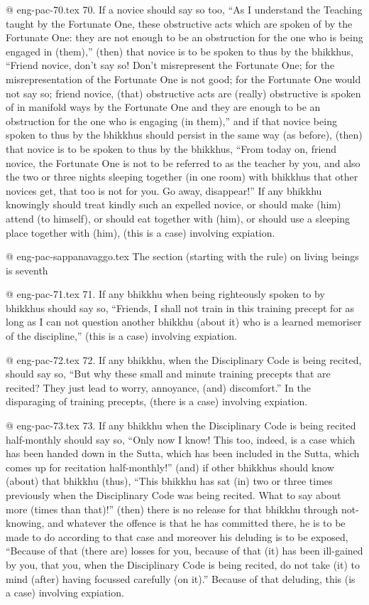 @ eng-pac-70.tex
70. If a novice should say so too, “As I understand the Teaching taught by the Fortunate One, these obstructive acts which are spoken of by the Fortunate One: they are not enough to be an obstruction for the one who is being engaged in (them),” (then) that novice is to be spoken to thus by the bhikkhus, “Friend novice, don't say so! Don't misrepresent the Fortunate One; for the misrepresentation of the Fortunate One is not good; for the Fortunate One would not say so; friend novice, (that) obstructive acts are (really) obstructive is spoken of in manifold ways by the Fortunate One and they are enough to be an obstruction for the one who is engaging (in them),” and if that novice being spoken to thus by the bhikkhus should persist in the same way (as before), (then) that novice is to be spoken to thus by the bhikkhus, “From today on, friend novice, the Fortunate One is not to be referred to as the teacher by you, and also the two or three nights sleeping together (in one room) with bhikkhus that other novices get, that too is not for you. Go away, disappear!” If any bhikkhu knowingly should treat kindly such an expelled novice, or should make (him) attend (to himself), or should eat together with (him), or should use a sleeping place together with (him), (this is a case) involving expiation.

@ eng-pac-sappanavaggo.tex
The section (starting with the rule) on living beings is seventh

@ eng-pac-71.tex
71. If any bhikkhu when being righteously spoken to by bhikkhus should say so, “Friends, I shall not train in this training precept for as long as I can not question another bhikkhu (about it) who is a learned memoriser of the discipline,” (this is a case) involving expiation.

@ eng-pac-72.tex
72. If any bhikkhu, when the Disciplinary Code is being recited, should say so, “But why these small and minute training precepts that are recited? They just lead to worry, annoyance, (and) discomfort.” In the disparaging of training precepts, (there is a case) involving expiation.

@ eng-pac-73.tex
73. If any bhikkhu when the Disciplinary Code is being recited half-monthly should say so, “Only now I know! This too, indeed, is a case which has been handed down in the Sutta, which has been included in the Sutta, which comes up for recitation half-monthly!” (and) if other bhikkhus should know (about) that bhikkhu (thus), “This bhikkhu has sat (in) two or three times previously when the Disciplinary Code was being recited. What to say about more (times than that)!” (then) there is no release for that bhikkhu through not-knowing, and whatever the offence is that he has committed there, he is to be made to do according to that case and moreover his deluding is to be exposed, “Because of that (there are) losses for you, because of that (it) has been ill-gained by you, that you, when the Disciplinary Code is being recited, do not take (it) to mind (after) having focussed carefully (on it).” Because of that deluding, this (is a case) involving expiation.

